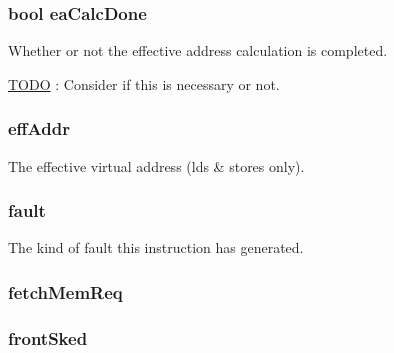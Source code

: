 \label{classInOrderDynInst_a15297c5fb430116b63bb672c74c8fac2}
\hypertarget{classInOrderDynInst_a4c89b34e605b9d5398d51e8d754035de}{
\subsubsection[{eaCalcDone}]{\setlength{\rightskip}{0pt plus 5cm}bool {\bf eaCalcDone}}}
\label{classInOrderDynInst_a4c89b34e605b9d5398d51e8d754035de}
Whether or not the effective address calculation is completed. \begin{Desc}
\item[\hyperlink{todo__todo000021}{TODO}]: Consider if this is necessary or not. \end{Desc}
\hypertarget{classInOrderDynInst_a1097c58b547d58e4544cbf31fa68a390}{
\subsubsection[{effAddr}]{ {\bf effAddr}}}
\label{classInOrderDynInst_a1097c58b547d58e4544cbf31fa68a390}
The effective virtual address (lds \& stores only). \hypertarget{classInOrderDynInst_a68714ceb74c60ea7ef5dec335bb6c5d7}{
\subsubsection[{fault}]{ {\bf fault}}}
\label{classInOrderDynInst_a68714ceb74c60ea7ef5dec335bb6c5d7}
The kind of fault this instruction has generated. \hypertarget{classInOrderDynInst_a6b197a69853684b56aa7016c2db75850}{
\subsubsection[{fetchMemReq}]{ {\bf fetchMemReq}}}
\label{classInOrderDynInst_a6b197a69853684b56aa7016c2db75850}
\hypertarget{classInOrderDynInst_a76a3bb102c3f09d0f6f8e13682e9d5bf}{
\subsubsection[{frontSked}]{ {\bf frontSked}}}
